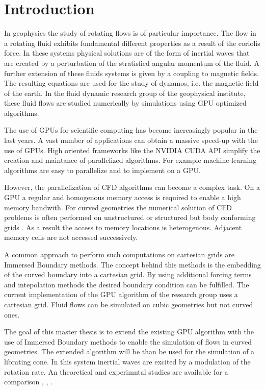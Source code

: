 \chapter{Introduction}

In geophysics the study of rotating flows is of particular importance.
The flow in a rotating fluid exhibits fundamental different properties as a result of the coriolis force.
In these systems physical solutions are of the form of inertial waves
that are created by a perturbation of the stratisfied angular momentum of the fluid.
A further extension of these fluids systems is given by a coupling to magnetic fields.
The resulting equations are used for the study of dynamos, i.e. the magnetic field of the earth.
In the fluid dynamic research group of the geophysical institute, these fluid flows are
studied numerically by simulations using GPU optimized algorithms.

The use of GPUs for scientific computing has become increasingly popular in the last years.
A vast number of applications  can obtain a massive speed-up with the use of GPUs.
High oriented frameworks like the NVIDIA CUDA API simplify the creation
and maintance of parallelized algorithms.
For example machine learning algorithms are easy to parallelize and to implement on a GPU.

However, the parallelization of CFD algorithms can become a complex task.
On a GPU a regular and homogenous memory access is required to enable a high memory bandwith.
For curved geometries the numerical solution of CFD problems is often performed
on unstructured  or structured but body conforming grids \citep{Mittal2005}.
As a result the access to memory locations is heterogenous.
Adjacent memory cells are not accessed successively.

A common approach to perform such computations on cartesian grids are Immersed Boundary methods.
The concept behind this methods is the embedding of the curved boundary into a cartesian grid.
By using additional forcing terms and intepolation methods the desired boundary condition can be fulfilled.
The current implementation of the GPU algorithm of the research group uses a cartesian grid.
Fluid flows can be simulated on cubic geometries but not curved ones.

The goal of this master thesis is to extend the existing GPU algorithm with the use of Immersed Boundary methods
to enable the simulation of flows in curved  geometries.
The extended algorithm will be than be used for the simulation of a librating cone.
In this system inertial waves are excited by a modulation of the rotation rate.
An theoretical and experimntal studies are available for a comparison \citep{1}, \citep{1}, \citep{1}.

